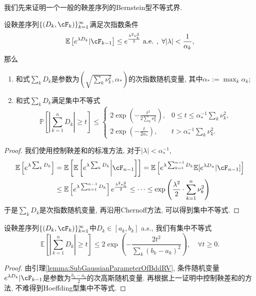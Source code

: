 我们先来证明一个一般的鞅差序列的Bernstein型不等式界. 
\begin{lemma}
	设鞅差序列$\{(D_k, \cF_k)\}_{k=1}^{\infty}$满足次指数条件
	\begin{equation*}
		\mathbb{E}\left[ e^{\lambda D_k} | \cF_{k-1} \right] 
		\leq e^{\frac{\lambda^2 \nu_k^2}{2}} \text{ a.e. },\; \forall |\lambda| < \frac{1}{\alpha_k}, 
	\end{equation*}
	那么
	\begin{enumerate}[label=(\arabic*)]
		\item 和式$\sum_k D_k$是参数为$\left( \sqrt{\sum_k \nu_k^2}, \alpha_* \right)$的次指数随机变量, 其中$\alpha_* := \max_k \alpha_k$; 
		\item 和式$\sum_k D_k$满足集中不等式
			\begin{equation*}
				\mathbb{P} \left[ \left| \sum_{k=1}^n D_k \right| \geq t \right] \leq 
				\begin{cases}
					2 \exp\left( -\frac{t^2}{2 \sum_k \nu_k^2} \right), & 0 \leq t \leq \alpha_*^{-1} \sum_k \nu_k^2, \\
					2 \exp\left(- \frac{t}{2 \alpha_*}\right), & t > \alpha_*^{-1} \sum_k \nu_k^2.
				\end{cases}
			\end{equation*}
	\end{enumerate}
\end{lemma}
\begin{proof}
	我们使用控制鞅差和的标准方法, 对于$|\lambda| < \alpha_*^{-1}$, 
	\begin{align*}
		\mathbb{E}\left[ e^{\lambda \sum_k D_k} \right]
		&= \mathbb{E}\left[ \mathbb{E}\left[ e^{\lambda \sum_k D_k} \bigg| \cF_{n-1} \right] \right] 
		= \mathbb{E}\left[ e^{\lambda \sum_{k=1}^{n-1} D_k} \mathbb{E}[e^{\lambda D_n} | \cF_{n-1}] \right] \\
		&\leq \mathbb{E}\left[ e^{\lambda \sum_{k=1}^{n-1} D_k} \right]  e^{\frac{\lambda^2 \nu_n^2}{2}} 
		\leq \dots
		\leq \exp\left(\frac{\lambda^2}{2} \cdot  \sum_{k=1}^n \nu_k^2 \right)
	\end{align*}
	于是$\sum_k D_k$是次指数随机变量, 再沿用Chernoff方法, 可以得到集中不等式. 
\end{proof} 

\begin{theorem}\label{thm:Azuma–Hoeffding}
	设鞅差序列$\{(D_k, \cF_k)\}_{k=1}^{\infty}$中$D_k \in [a_k, b_k]$ a.s., 我们有集中不等式
	\begin{equation*}
		\mathbb{E} \left[ \left| \sum_{k=1}^n D_k \right| \geq t \right]
		\leq 2 \exp \left(- \frac{2 t^2}{\sum_k (b_k - a_k)^2} \right), 
		\quad \forall t \geq 0. 
	\end{equation*}	
\end{theorem}
\begin{proof}
	由引理\ref{lemma:SubGaussianParameterOfBddRV}, 条件随机变量$e^{\lambda D_k} | \cF_{k-1}$是参数为$\frac{b_k - a_k}{2}$的次高斯随机变量. 
	再根据上一证明中控制鞅差和的方法, 不难得到Hoeffding型集中不等式. 
\end{proof}

